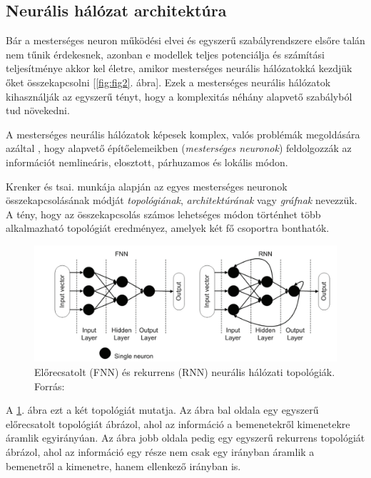 \documentclass[12pt,a4]{article}
\begin{document}
	\subsection{Neurális hálózat architektúra}
	
	Bár a mesterséges neuron működési elvei és 
	egyszerű szabályrendszere elsőre talán nem tűnik érdekesnek, azonban e modellek teljes potenciálja és számítási teljesítménye akkor kel életre, 
	amikor mesterséges neurális hálózatokká
	kezdjük őket összekapcsolni [\ref{fig:fig2}. ábra]. 
	Ezek a mesterséges neurális hálózatok 
	kihasználják az egyszerű tényt, 
	hogy a komplexitás néhány alapvető
	szabályból tud növekedni.
	
	A mesterséges neurális hálózatok 
	képesek komplex, valós problémák megoldására azáltal
	, hogy 
	alapvető építőelemeikben (\textit{mesterséges neuronok}) feldolgozzák az információt nemlineáris,
	elosztott, párhuzamos és lokális módon.
	
	\cite{krenker}Krenker és tsai. 
	   munkája alapján az egyes mesterséges 
	neuronok összekapcsolásának módját 
	\textit{topológiának}, \textit{architektúrának} 
	vagy \textit{gráfnak} nevezzük. A tény, 
	hogy az összekapcsolás
	számos lehetséges módon történhet több alkalmazható topológiát eredményez, amelyek két fő csoportra bonthatók. 

    \begin{figure}[h]	
		\centering
		\includegraphics[width=1\linewidth]{topologies}
        
		\caption{Előrecsatolt (FNN) és rekurrens (RNN) \newline\centering  neurális hálózati topológiák. 
			Forrás:\cite{krenker}}
        \label{fig:topologies}
	\end{figure}
	
	A \ref{fig:topologies}. ábra ezt a két topológiát mutatja. Az ábra bal oldala egy egyszerű előrecsatolt topológiát ábrázol, ahol az információ a bemenetekről kimenetekre áramlik egyirányúan. Az ábra jobb oldala pedig egy egyszerű rekurrens topológiát ábrázol, ahol az információ egy része nem csak egy irányban áramlik a bemenetről a kimenetre, hanem ellenkező irányban is.
\end{document}
